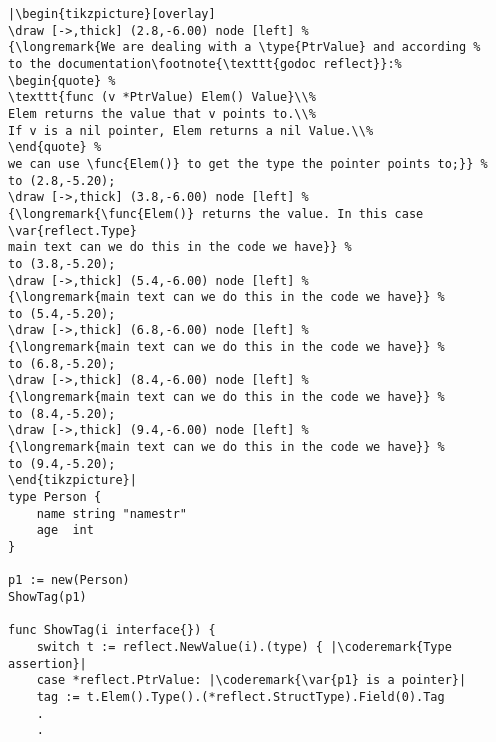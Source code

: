 \begin{lstlisting}[caption=Introspection using reflection,label=src:introspection]
|\begin{tikzpicture}[overlay]
\draw [->,thick] (2.8,-6.00) node [left] %
{\longremark{We are dealing with a \type{PtrValue} and according %
to the documentation\footnote{\texttt{godoc reflect}}:%
\begin{quote} %
\texttt{func (v *PtrValue) Elem() Value}\\%
Elem returns the value that v points to.\\%
If v is a nil pointer, Elem returns a nil Value.\\%
\end{quote} %
we can use \func{Elem()} to get the type the pointer points to;}} %
to (2.8,-5.20);
\draw [->,thick] (3.8,-6.00) node [left] %
{\longremark{\func{Elem()} returns the value. In this case \var{reflect.Type} 
main text can we do this in the code we have}} %
to (3.8,-5.20);
\draw [->,thick] (5.4,-6.00) node [left] %
{\longremark{main text can we do this in the code we have}} %
to (5.4,-5.20);
\draw [->,thick] (6.8,-6.00) node [left] %
{\longremark{main text can we do this in the code we have}} %
to (6.8,-5.20);
\draw [->,thick] (8.4,-6.00) node [left] %
{\longremark{main text can we do this in the code we have}} %
to (8.4,-5.20);
\draw [->,thick] (9.4,-6.00) node [left] %
{\longremark{main text can we do this in the code we have}} %
to (9.4,-5.20);
\end{tikzpicture}|
type Person {
    name string "namestr"
    age  int
}

p1 := new(Person)
ShowTag(p1)

func ShowTag(i interface{}) {
    switch t := reflect.NewValue(i).(type) { |\coderemark{Type assertion}|
    case *reflect.PtrValue: |\coderemark{\var{p1} is a pointer}|
	tag := t.Elem().Type().(*reflect.StructType).Field(0).Tag
	.
	.
\end{lstlisting}
